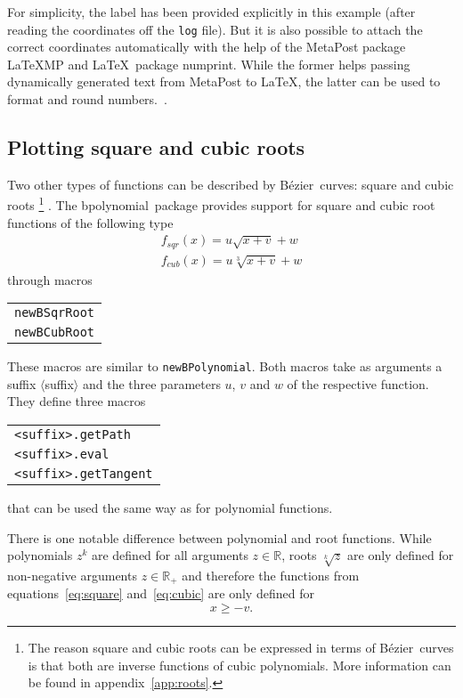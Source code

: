 \documentclass{article}
\newcommand*{\cmd}[1]{\texttt{#1}}
\newcommand*{\name}[1]{\textsf{#1}}
\newcommand*{\pkg}{\name{bpolynomial}}
\newcommand*{\B}{B\'ezier}
\begin{document}
For simplicity, the label has been provided explicitly in this example (after reading the coordinates off the \cmd{log} file).  But it is also possible to attach the correct coordinates automatically with the help of the MetaPost package \name{LaTeXMP} and \LaTeX\ package \name{numprint}.  While the former helps passing dynamically generated text from MetaPost to \LaTeX, the latter can be used to format and round numbers.~\cite{latex:numprint, mp:latexmp}.

\subsection{Plotting square and cubic roots}\label{sec:roots}
Two other types of functions can be described by \B\ curves:  square and cubic roots%
\footnote{The reason square and cubic roots can be expressed in terms of \B\ curves is that both are inverse functions of cubic polynomials.  More information can be found in appendix~\ref{app:roots}.}%
.  The \pkg\ package provides support for square and cubic root functions of the following type
\begin{align}
  f_{sqr}(x) = u \sqrt{x + v} + w\label{eq:square} \\
  f_{cub}(x) = u \sqrt[3]{x + v} + w\label{eq:cubic}
\end{align}
through macros
\begin{center}
  \begin{tabular}{l}
    \cmd{newBSqrRoot} \\
    \cmd{newBCubRoot} \\
  \end{tabular}
\end{center}

These macros are similar to \cmd{newBPolynomial}.  Both macros take as arguments a suffix $\langle$suffix$\rangle$ and the three parameters $u$, $v$ and $w$ of the respective function.  They define three macros
\begin{center}
  \begin{tabular}{l}
    \cmd{<suffix>.getPath} \\
    \cmd{<suffix>.eval} \\
    \cmd{<suffix>.getTangent} \\
  \end{tabular}
\end{center}
that can be used the same way as for polynomial functions.

There is one notable difference between polynomial and root functions.  While polynomials $z^k$ are defined for all arguments $z \in \mathbb{R}$, roots $\sqrt[k]{z}$ are only defined for non-negative arguments $z \in \mathbb{R_+}$ and therefore the functions from equations~\ref{eq:square} and~\ref{eq:cubic} are only defined for
\begin{equation}
   x \geq -v.\label{eq:rootargument}
\end{equation}
\end{document}
